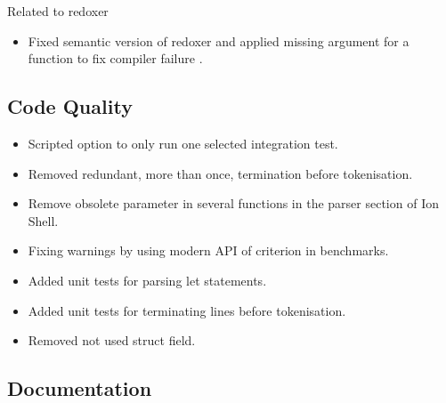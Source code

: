 Related to \gls{redoxer}

\begin{itemize}
	\item Fixed semantic version of \gls{redoxer} and applied missing argument for a function to fix compiler failure \cite{pr_bump_fix_redoxer}.
\end{itemize}

\subsection{Code Quality}
\label{accomplishment_code_quality}

\begin{itemize}
	\item Scripted option to only run one selected integration test. \cite{pr_single_test_selectable}
	\item Removed redundant, more than once, termination before tokenisation. \cite{pr_removed_redundant_termination}
	\item Remove obsolete parameter in several functions in the parser section of Ion Shell. \cite{pr_remove_not_needed_parameter}
	\item Fixing warnings by using modern API of criterion in benchmarks. \cite{pr_fix_warnings_deprecated_criterion_api}
	\item Added unit tests for parsing let statements. \cite{pr_added_unit_test_let_grammar}
	\item Added unit tests for terminating lines before tokenisation. \cite{pr_test_terminator_todos}
	\item Removed not used struct field. \cite{pr_removed_flag_undead_code}
\end{itemize}

\subsection{Documentation}\label{accomblishment_docs}


